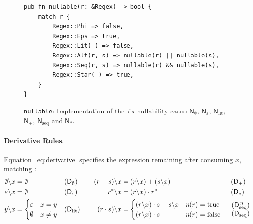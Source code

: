 \begin{figure}[H]
\small
\begin{verbatim}
pub fn nullable(r: &Regex) -> bool {
    match r {
        Regex::Phi => false,
        Regex::Eps => true,
        Regex::Lit(_) => false,
        Regex::Alt(r, s) => nullable(r) || nullable(s),
        Regex::Seq(r, s) => nullable(r) && nullable(s),
        Regex::Star(_) => true,
    }
}
\end{verbatim}
\caption{\texttt{nullable}: Implementation of the six nullability cases:
$\mathsf{N}_{\emptyset}$, $\mathsf{N}_{\varepsilon}$,
$\mathsf{N}_{\mathrm{lit}}$, $\mathsf{N}_{+}$,
$\mathsf{N}_{\mathrm{seq}}$ and $\mathsf{N}_{*}$.}
\label{fig:nullable-rust}
\end{figure}



%

\paragraph{Derivative Rules.}
\label{par:derivative-rules}

Equation~\eqref{eq:derivative} specifies the expression remaining 
after consuming $x$, matching \citet[Fig.~3]{sulzmannlu2014}:
\begin{equation}\label{eq:derivative}
\begin{aligned}
\emptyset \backslash x &= \emptyset &&(\mathsf{D}_{\emptyset}) 
\quad &
(r + s) \backslash x &= (r \backslash x) + (s \backslash x) &&\hspace{0.4em}(\mathsf{D}_{+}) \\
\varepsilon \backslash x &= \emptyset &&(\mathsf{D}_{\varepsilon})
\quad &
r^{*} \backslash x &= (r \backslash x) \cdot r^{*} &&\hspace{0.4em}(\mathsf{D}_{*}) \\
y \backslash x &= \begin{cases}
  \varepsilon & x = y \\
  \emptyset & x \neq y
\end{cases}
&&(\mathsf{D}_{\mathrm{lit}})
\quad &
(r \cdot s) \backslash x &= \begin{cases}
  (r \backslash x) \cdot s + s \backslash x & n(r) = \mathrm{true} \\
  (r \backslash x) \cdot s & n(r) = \mathrm{false}
\end{cases}
&&\begin{array}{l}
(\mathsf{D}_{\mathrm{seq}}^{\,n}) \\
(\mathsf{D}_{\mathrm{seq}})
\end{array}
\end{aligned}
\end{equation}

